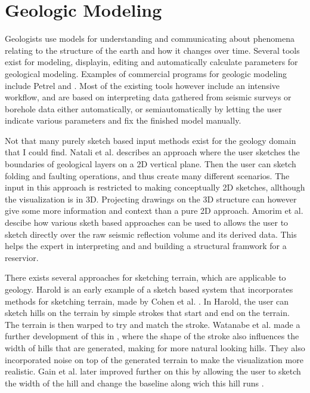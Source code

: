 \documentclass[a4paper,12pt]{report}
\begin{document}
\section{Geologic Modeling}
Geologists use models for understanding and communicating about phenomena relating to the structure of the earth and how it changes over time. Several tools exist for modeling, displayin, editing and automatically calculate parameters for geological modeling. Examples of commercial programs for geologic modeling include Petrel \cite{petrel} and . Most of the existing tools however include an intensive workflow, and are based on interpreting data gathered from seismic surveys or borehole data either automatically, or semiautomatically by letting the user indicate various parameters and fix the finished model manually.

Not that many purely sketch based input methods exist for the geology domain that I could find. Natali et al. \cite{natalirapid} describes an approach where the user sketches the boundaries of geological layers on a 2D vertical plane. Then the user can sketch folding and faulting operations, and thus create many different scenarios. The input in this approach is restricted to making conceptually 2D sketches, allthough the visualization is in 3D. Projecting drawings on the 3D structure can however give some more information and context than a pure 2D approach. Amorim et al. \cite{amorim2012sketch} descibe how various sketh based approaches can be used to allows the user to sketch directly over the raw seismic reflection volume and its derived data. This helps the expert in interpreting and and building a structural framwork for a reservior.

There exists several approaches for sketching terrain, which are applicable to geology. Harold is an early example of a sketch based system that incorporates methods for sketching terrain, made by Cohen et al. \cite{cohen2000harold}. In Harold, the user can sketch hills on the terrain by simple strokes that start and end on the terrain. The terrain is then warped to try and match the stroke. Watanabe et al. made a further development of this in \cite{Watanabe:2004:SIT:1186415.1186500}, where the shape of the stroke also influences the width of hills that are generated, making for more natural looking hills. They also incorporated noise on top of the generated terrain to make the visualization more realistic. Gain et al. later improved further on this by allowing the user to sketch the width of the hill and change the baseline along wich this hill runs \cite{Gain:2009:TS:1507149.1507155}.
\end{document}
